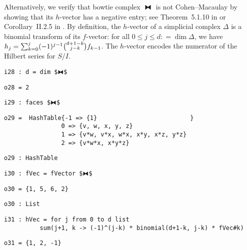 \documentclass[12pt,leqno]{amsart}
\theoremstyle{definition}
\newcommand{\colequal}{\ensuremath{:\!=}}
\begin{document}
Alternatively, we verify that bowtie complex $⧓$ is not Cohen--Macaulay by
showing that its $h$-vector has a negative entry; see Theorem~5.1.10 in
\cite{BH} or Corollary~II.2.5 in \cite{Stanley}.  By definition, the
$h$-vector of a simplicial complex $\Delta$ is a binomial transform of its
$f\!$-vector: for all $0 \leqslant j \leqslant d \colequal \dim \Delta$, we have
$h_j = \sum_{k=0}^{j} (-1)^{j-1}
\smash{\tbinom{d+1-k}{\raisebox{3pt}{$\scriptstyle j-k$}}} f_{k-1}$.  The
$h$-vector encodes the numerator of the Hilbert series for $S/I$.
\begin{lstlisting}[xleftmargin=10pt, aboveskip=5.0pt, belowskip=1.5pt]
i28 : d = dim $⧓$
\end{lstlisting}
\begin{lstlisting}[xleftmargin=10pt, aboveskip=1.5pt, belowskip=1.5pt]
o28 = 2
\end{lstlisting}
\begin{lstlisting}[xleftmargin=10pt, aboveskip=1.5pt, belowskip=1.5pt]
i29 : faces $⧓$
\end{lstlisting}
\begin{lstlisting}[xleftmargin=10pt, lineskip=-10pt, aboveskip=4pt, belowskip=1pt]
o29 =  HashTable{-1 => {1}                          }
                0 => {v, w, x, y, z}
                1 => {v*w, v*x, w*x, x*y, x*z, y*z}
                2 => {v*w*x, x*y*z}
\end{lstlisting}
\begin{lstlisting}[xleftmargin=10pt, aboveskip=1.5pt, belowskip=1.5pt]
o29 : HashTable
\end{lstlisting}
\begin{lstlisting}[xleftmargin=10pt, aboveskip=1.5pt, belowskip=1.5pt]
i30 : fVec = fVector $⧓$
\end{lstlisting}
\begin{lstlisting}[xleftmargin=10pt, aboveskip=1.5pt, belowskip=1.5pt]
o30 = {1, 5, 6, 2}
\end{lstlisting}
\begin{lstlisting}[xleftmargin=10pt, aboveskip=1.5pt, belowskip=1.5pt]
o30 : List
\end{lstlisting}
\begin{lstlisting}[xleftmargin=10pt, lineskip=-10pt, aboveskip=4pt, belowskip=1pt]
i31 : hVec = for j from 0 to d list 
          sum(j+1, k -> (-1)^(j-k) * binomial(d+1-k, j-k) * fVec#k)
\end{lstlisting}
\vfill
\begin{lstlisting}[xleftmargin=10pt, aboveskip=1.5pt, belowskip=1.5pt]
o31 = {1, 2, -1}
\end{lstlisting}
\end{document}
